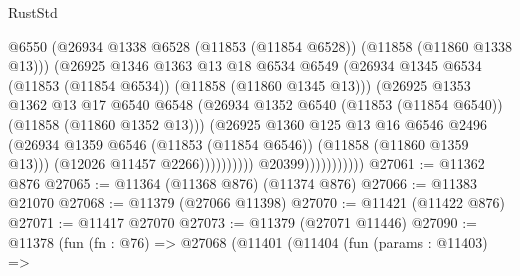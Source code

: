 \begin{lexlean}{RustStd}
\begin{coremodule}
                                      @6550
                                      (@26934
                                        @1338
                                        @6528
                                        (@11853 (@11854 @6528))
                                        (@11858 (@11860 @1338 @13)))
                                      (@26925
                                        @1346
                                        @1363
                                        @13
                                        @18
                                        @6534
                                        @6549
                                        (@26934
                                          @1345
                                          @6534
                                          (@11853 (@11854 @6534))
                                          (@11858 (@11860 @1345 @13)))
                                        (@26925
                                          @1353
                                          @1362
                                          @13
                                          @17
                                          @6540
                                          @6548
                                          (@26934
                                            @1352
                                            @6540
                                            (@11853 (@11854 @6540))
                                            (@11858 (@11860 @1352 @13)))
                                          (@26925
                                            @1360
                                            @125
                                            @13
                                            @16
                                            @6546
                                            @2496
                                            (@26934
                                              @1359
                                              @6546
                                              (@11853 (@11854 @6546))
                                              (@11858 (@11860 @1359 @13)))
                                            (@12026 @11457 @2266))))))))))
                          @20399)))))))))))
@27061 := @11362 @876
@27065 := @11364 (@11368 @876) (@11374 @876)
@27066 := @11383 @21070
@27068 := @11379 (@27066 @11398)
@27070 := @11421 (@11422 @876)
@27071 := @11417 @27070
@27073 := @11379 (@27071 @11446)
@27090 := @11378
    (fun (fn : @76) =>
    @27068
      (@11401
        (@11404
          (fun (params : @11403) =>

\end{coremodule}
\end{lexlean}

